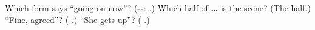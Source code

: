 \begin{tcolorbox}[breakable,colback=teal!4,colframe=teal!35!black,title={Before you move on}]
Which form says \textquotedblleft{}going on now\textquotedblright{}? (\textbf{--}: \textbf{}.) Which half of \textbf{ … } is the scene? (The \textbf{} half.) \textquotedblleft{}Fine, agreed\textquotedblright{}? (\textbf{ }.) \textquotedblleft{}She gets up\textquotedblright{}? (\textbf{ }.)
\end{tcolorbox}
